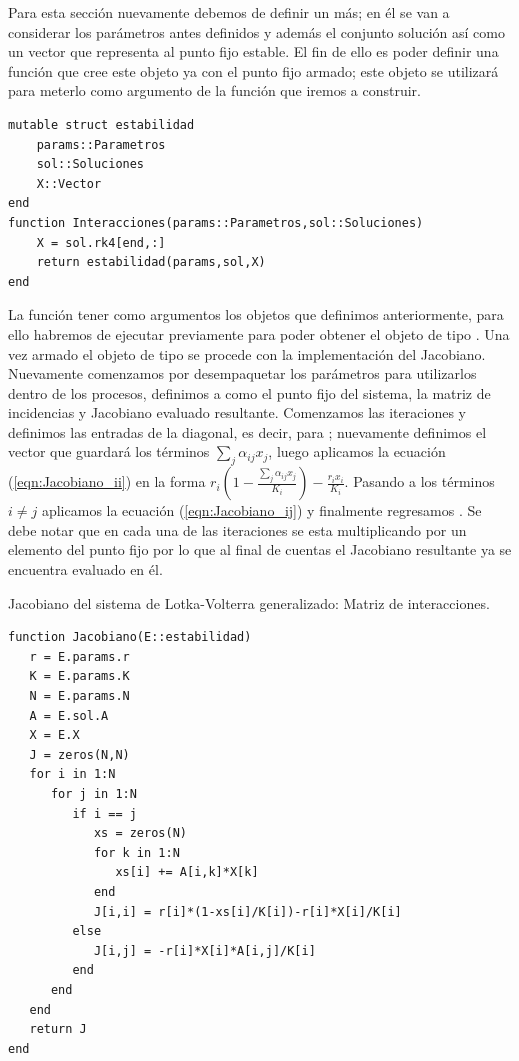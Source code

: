 Para esta sección nuevamente debemos de definir un  más; en él se van a considerar los parámetros antes definidos y además el conjunto solución así como un vector que representa al punto fijo estable. El fin de ello es poder definir una función que cree este objeto ya con el punto fijo armado; este objeto se utilizará para meterlo como argumento de la función  que iremos a construir.
\begin{verbatim}
mutable struct estabilidad
	params::Parametros
	sol::Soluciones
	X::Vector
end
function Interacciones(params::Parametros,sol::Soluciones)
	X = sol.rk4[end,:]
	return estabilidad(params,sol,X)
end
\end{verbatim}
La función  tener como argumentos los objetos que definimos anteriormente, para ello habremos de ejecutar previamente  para poder obtener el objeto de tipo . Una vez armado el objeto de tipo  se procede con la implementación del Jacobiano. Nuevamente comenzamos por desempaquetar los parámetros para utilizarlos dentro de los procesos, definimos a  como el punto fijo del sistema,  la matriz de incidencias y  Jacobiano evaluado resultante. Comenzamos las iteraciones y definimos las entradas de la diagonal, es decir, para ; nuevamente definimos el vector  que guardará los términos $\sum_j\alpha_{ij}x_j$, luego aplicamos la ecuación (\ref{eqn:Jacobiano_ii}) en la forma $r_i\left (1-\frac{\sum_j\alpha_{ij}x_j}{K_i}\right )-\frac{r_ix_i}{K_i}$. Pasando a los términos $i\neq j$ aplicamos la ecuación (\ref{eqn:Jacobiano_ij}) y finalmente regresamos . Se debe notar que en cada una de las iteraciones se esta multiplicando por un elemento del punto fijo  por lo que al final de cuentas el Jacobiano resultante ya se encuentra evaluado en él.
\begin{algorithm}
	\label{al:Jacobiano}
	\caption{Jacobiano del sistema de Lotka-Volterra generalizado: Matriz de interacciones.}
	\begin{verbatim}
function Jacobiano(E::estabilidad)
   r = E.params.r
   K = E.params.K
   N = E.params.N
   A = E.sol.A
   X = E.X
   J = zeros(N,N)
   for i in 1:N
      for j in 1:N
         if i == j
            xs = zeros(N)
            for k in 1:N
               xs[i] += A[i,k]*X[k]
            end
            J[i,i] = r[i]*(1-xs[i]/K[i])-r[i]*X[i]/K[i]
         else
            J[i,j] = -r[i]*X[i]*A[i,j]/K[i]
         end
      end
   end
   return J
end     
	\end{verbatim}
\end{algorithm}

